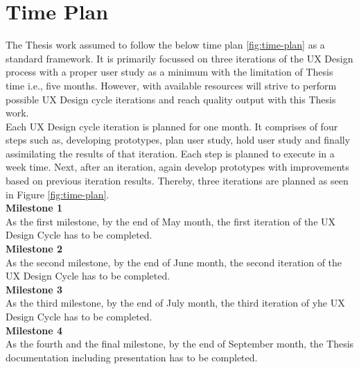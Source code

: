 \chapter{Time Plan}
\label{ch:timeplan}

The Thesis work assumed to follow the below time plan \ref{fig:time-plan} as a standard framework. It is primarily focussed on three iterations of the UX Design process with a proper user study as a minimum with the limitation of Thesis time i.e., five months. However, with available resources will strive to perform possible UX Design cycle iterations and reach quality output with this Thesis work. \\

Each UX Design cycle iteration is planned for one month. It comprises of four steps such as, developing prototypes, plan user study, hold user study and finally assimilating the results of that iteration. Each step is planned to execute in a week time. Next, after an iteration, again develop prototypes with improvements based on previous iteration results. Thereby, three iterations are planned as seen in Figure \ref{fig:time-plan}. \\ 

\textbf{Milestone 1} \\

As the first milestone, by the end of May month, the first iteration of the UX Design Cycle has to be completed. \\ 

\textbf{Milestone 2} \\

As the second milestone, by the end of June month, the second iteration of the UX Design Cycle has to be completed. \\ 

\textbf{Milestone 3} \\

As the third milestone, by the end of July month, the third iteration of yhe UX Design Cycle has to be completed. \\

\textbf{Milestone 4} \\

As the fourth and the final milestone, by the end of September month, the Thesis documentation including presentation has to be completed. \\

